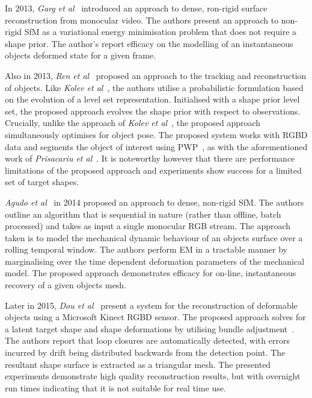 In 2013, \textit{Garg et al}~\cite{Garg2013} introduced an approach to dense, ron-rigid surface reconstruction 
from monocular video. The authors present an approach to non-rigid SfM as a variational energy minimisation 
problem that does not require a shape prior. The author's report efficacy on the modelling of an instantaneous 
objects deformed state for a given frame.

Also in 2013, \textit{Ren et al}~\cite{Ren2013} proposed an approach to the tracking and reconstruction of 
objects. Like \textit{Kolev et al}~\cite{Kolev2006}, the authors utilise a probabilistic formulation 
based on the evolution of a level set representation. Initialised with a shape prior level set, the 
proposed approach evolves the shape prior with respect to observations. Crucially, unlike the approach of 
\textit{Kolev et al}~\cite{Kolev2006}, the proposed approach simultaneously optimises for object pose.
The proposed system works with RGBD data and segments the object of interest using PWP~\cite{Bibby2008}, as 
with the aforementioned work of \textit{Prisacariu et al}~\cite{Prisacariu2012}. It is noteworthy however 
that there are performance limitations of the proposed approach and experiments show success for a limited 
set of target shapes.

\textit{Agudo et al}~\cite{Agudo2014} in 2014 proposed an approach to dense, non-rigid SfM. The authors outline 
an algorithm that is sequential in nature (rather than offline, batch processed) and takes as input a single 
monocular RGB stream. The approach taken is to model the mechanical dynamic behaviour of an objects surface over 
a rolling temporal window. The authors perform EM in a tractable manner by marginalising over the time 
dependent deformation parameters of the mechanical model. The proposed approach demonstrates efficacy for 
on-line, instantaneous recovery of a given objects mesh.

Later in 2015, \textit{Dou et al}~\cite{Dou2015} present a system for the reconstruction of deformable 
objects using a Microsoft Kinect RGBD sensor. The proposed approach solves for a latent target shape 
and shape deformations by utilising bundle adjustment~\cite{Triggs1999}. The authors report that loop 
closures are automatically detected, with errors incurred by drift being distributed backwards from the 
detection point. The resultant shape surface is extracted as a triangular mesh. The presented experiments 
demonstrate high quality reconstruction results, but with overnight run times indicating that it is not 
suitable for real time use.

